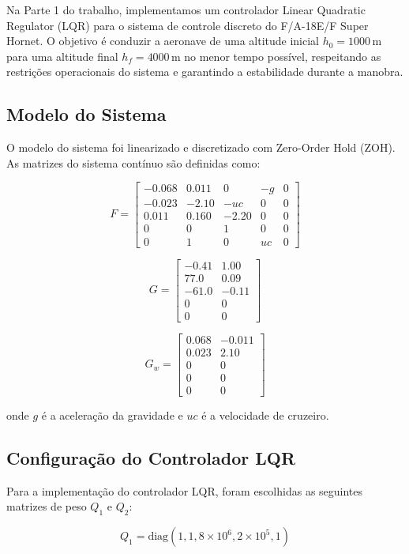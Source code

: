\documentclass[a4paper, 12pt]{article}
\begin{document}
Na Parte 1 do trabalho, implementamos um controlador Linear Quadratic Regulator (LQR) para o sistema de controle discreto do F/A-18E/F Super Hornet. O objetivo é conduzir a aeronave de uma altitude inicial \( h_0 = 1000 \, \text{m} \) para uma altitude final \( h_f = 4000 \, \text{m} \) no menor tempo possível, respeitando as restrições operacionais do sistema e garantindo a estabilidade durante a manobra.

\subsection{Modelo do Sistema}

O modelo do sistema foi linearizado e discretizado com Zero-Order Hold (ZOH). As matrizes do sistema contínuo são definidas como:

\[
F = \begin{bmatrix}
-0.068 & 0.011 & 0 & -g & 0 \\
-0.023 & -2.10 & -uc & 0 & 0 \\
0.011 & 0.160 & -2.20 & 0 & 0 \\
0 & 0 & 1 & 0 & 0 \\
0 & 1 & 0 & uc & 0
\end{bmatrix}
\]

\[
G = \begin{bmatrix}
-0.41 & 1.00 \\
77.0 & 0.09 \\
-61.0 & -0.11 \\
0 & 0 \\
0 & 0
\end{bmatrix}
\]

\[
G_w = \begin{bmatrix}
0.068 & -0.011 \\
0.023 & 2.10 \\
0 & 0 \\
0 & 0 \\
0 & 0
\end{bmatrix}
\]

onde \( g \) é a aceleração da gravidade e \( uc \) é a velocidade de cruzeiro.

\subsection{Configuração do Controlador LQR}

Para a implementação do controlador LQR, foram escolhidas as seguintes matrizes de peso \( Q_1 \) e \( Q_2 \):

\[
Q_1 = \text{diag}(1, 1, 8 \times 10^6, 2 \times 10^5, 1)
\]
\end{document}
